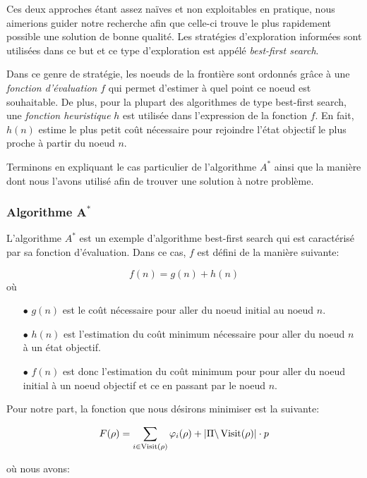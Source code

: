 Ces deux approches étant assez naïves et non exploitables en pratique, nous aimerions guider notre recherche afin que celle-ci trouve le plus rapidement possible une solution de bonne qualité. Les stratégies d'exploration informées sont utilisées dans ce but et ce type d'exploration est appélé \emph{best-first search}.

Dans ce genre de stratégie, les noeuds de la frontière sont ordonnés grâce à une \emph{fonction d'évaluation} $f$ qui permet d'estimer à quel point ce noeud est souhaitable. De plus, pour la plupart des algorithmes de type best-first search, une \emph{fonction heuristique} $h$ est utilisée dans l'expression de la fonction $f$. En fait, $h(n)$ estime le plus petit coût nécessaire pour rejoindre l'état objectif le plus proche à partir du noeud $n$.

Terminons en expliquant le cas particulier de l'algorithme $A^*$ ainsi que la manière dont nous l'avons utilisé afin de trouver une solution à notre problème.

\subsubsection{Algorithme $\mathbf{A^*}$}
\label{subsubsection:aStar}

L'algorithme $A^*$ est un exemple d'algorithme best-first search qui est caractérisé par sa fonction d'évaluation. Dans ce cas, $f$ est défini de la manière suivante:

$$f(n) = g(n) + h(n)$$
où 
\begin{itemize}
	\item[$\bullet$] $g(n)$ est le coût nécessaire pour aller du noeud initial au noeud $n$.
	\item[$\bullet$] $h(n)$ est l'estimation du coût minimum nécessaire pour aller du noeud $n$ à un état objectif.
	\item[$\bullet$] $f(n)$ est donc l'estimation du coût minimum pour pour aller du noeud initial à un noeud objectif et ce en passant par le noeud $n$.
\end{itemize}

Pour notre part, la fonction que nous désirons minimiser est la suivante:

$$ F(\rho) = \sum_{i \in \operatorname*{Visit}(\rho)} \varphi_i(\rho) + |\Pi \backslash \operatorname*{Visit}(\rho)| \cdot p$$

où nous avons:

